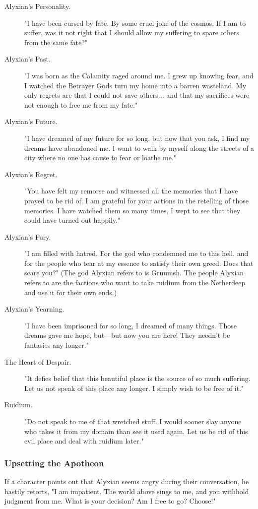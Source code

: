 \documentclass[10pt,a4paper,twoside,fancy,bg=print,twocolumn,openany,nodeprecatedcode]{dndbook}
\begin{document}
\begin{description}
\item[Alyxian's Personality.]
"I have been cursed by fate. By some cruel joke of the cosmos. If I am to suffer, was it not right that I should allow my suffering to spare others from the same fate?"
\item[Alyxian's Past.]
"I was born as the Calamity raged around me. I grew up knowing fear, and I watched the Betrayer Gods turn my home into a barren wasteland. My only regrets are that I could not save others... and that my sacrifices were not enough to free me from my fate."
\item[Alyxian's Future.]
"I have dreamed of my future for so long, but now that you ask, I find my dreams have abandoned me. I want to walk by myself along the streets of a city where no one has cause to fear or loathe me."
\item[Alyxian's Regret.]
"You have felt my remorse and witnessed all the memories that I have prayed to be rid of. I am grateful for your actions in the retelling of those memories. I have watched them so many times, I wept to see that they could have turned out happily."
\item[Alyxian's Fury.]
"I am filled with hatred. For the god who condemned me to this hell, and for the people who tear at my essence to satisfy their own greed. Does that scare you?" (The god Alyxian refers to is Gruumsh. The people Alyxian refers to are the factions who want to take ruidium from the Netherdeep and use it for their own ends.)
\item[Alyxian's Yearning.]
"I have been imprisoned for so long, I dreamed of many things. Those dreams gave me hope, but—but now you are here! They needn't be fantasies any longer."
\item[The Heart of Despair.]
"It defies belief that this beautiful place is the source of so much suffering. Let us not speak of this place any longer. I simply wish to be free of it."
\item[Ruidium.]
"Do not speak to me of that wretched stuff. I would sooner slay anyone who takes it from my domain than see it used again. Let us be rid of this evil place and deal with ruidium later."
\end{description}

\subsubsection{Upsetting the Apotheon}
If a character points out that Alyxian seems angry during their conversation, he hastily retorts, "I am impatient. The world above sings to me, and you withhold judgment from me. What is your decision? Am I free to go? Choose!"
\end{document}
